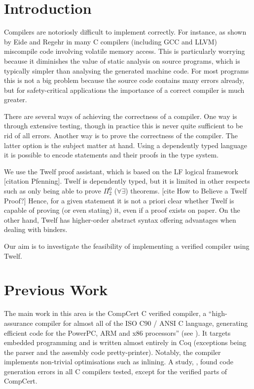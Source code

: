\section{Introduction}
Compilers are notoriosly difficult to implement correctly.
For instance, as shown by Eide and Regehr in \cite{EideRegehr08} many C compilers (including GCC and LLVM) miscompile code involving volatile memory access.
This is particularly worrying because it diminishes the value of static analysis on source programs, which is typically simpler than analysing the generated machine code.
For most programs this is not a big problem because the source code contains many errors already, but for safety-critical applications the importance of a correct compiler is much greater.

There are several ways of achieving the correctness of a compiler.
One way is through extensive testing, though in practice this is never quite sufficient to be rid of all errors.
Another way is to prove the correctness of the compiler.
The latter option is the subject matter at hand.
Using a dependently typed language it is possible to encode statements and their proofs in the type system.

We use the Twelf proof assistant, which is based on the LF logical framework [citation Pfenning].
Twelf is dependently typed, but it is limited in other respects such as only being able to prove $\Pi_2^0$ ($\forall \exists$) theorems. [cite How to Believe a Twelf Proof?]
Hence, for a given statement it is not a priori clear whether Twelf is capable of proving (or even stating) it, even if a proof exists on paper.
On the other hand, Twelf has higher-order abstract syntax offering advantages when dealing with binders.

Our aim is to investigate the feasibility of implementing a verified compiler using Twelf.


\section{Previous Work}

The main work in this area is the CompCert C verified compiler, a ``high-assurance compiler for almost all of the ISO C90 / ANSI C language, generating efficient code for the PowerPC, ARM and x86 processors'' (see \cite{CompCert16}).
It targets embedded programming and is written almost entirely in Coq (exceptions being the parser and the assembly code pretty-printer).
Notably, the compiler implements non-trivial optimisations such as inlining.
A study, \cite{Yang11}, found code generation errors in all C compilers tested, except for the verified parts of CompCert.

